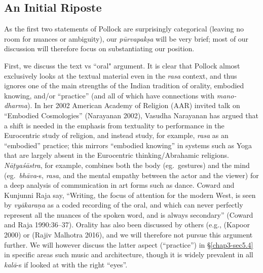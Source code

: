 \subsection{An Initial Riposte}\label{chap3-sec1.1}

As the first two statements of Pollock are surprisingly categorical (leaving no room for nuances or ambiguity), our \textsl{pūrvapakṣa} will be very brief; most of our discussion will therefore focus on substantiating our position. 

First, we discuss the text vs “oral" argument. It is clear that Pollock almost exclusively looks at the textual material even in the \textsl{rasa} context, and thus ignores one of the main strengths of the Indian tradition of orality, embodied knowing, and/or “practice” (and all of which have connections with \textsl{mano-dharma}). In her 2002 American Academy of Religion (AAR) invited talk on “Embodied Cosmologies” (Narayanan 2002), Vasudha Narayanan has argued that a shift is needed in the emphasis from textuality to performance in the Eurocentric study of religion, and instead study, for example, \textsl{rasa} as an “embodied” practice; this mirrors “embodied knowing” in systems such as Yoga that are largely absent in the Eurocentric thinking/Abrahamic religions. \textsl{Nāṭyaśāstra}, for example, combines both the body (eg.~gestures) and the mind (eg.~\textsl{bhāva}-s, \textsl{rasa}, and the mental empathy between the actor and the viewer) for a deep analysis of communication in art forms such as dance. Coward and Kunjunni Raja say, “Writing, the focus of attention for the modern West, is seen by \textsl{vyākaraṇa} as a coded recording of the oral, and which can never perfectly represent all the nuances of the spoken word, and is always secondary” (Coward and Raja 1990:36--37). Orality has also been discussed by others (e.g., (Kapoor 2000) or (Rajiv Malhotra 2016), and we will therefore not pursue this argument further. We will however discuss the latter aspect (“practice”) in \S\ref{chap3-sec5.4} in specific areas such music and architecture, though it is widely prevalent in all \textsl{kalā}-s if looked at with the right “eyes”.

